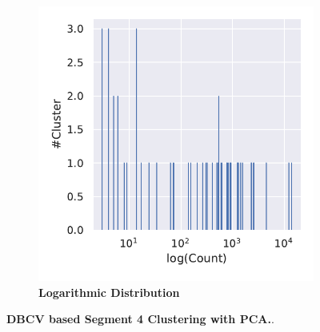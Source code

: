 \begin{figure}
\begin{adjustbox}{minipage=\dimexpr{}\fboxrule,fbox}
\begin{subfigure}[b]{0.475\textwidth}
            \includegraphics[width=\textwidth]{PCA/Cluster_Distribution_Log_Segment_4_alternative.pdf}
            \caption[Logarithmic Distribution]{\textbf{Logarithmic Distribution}}
            \label{subfig:PCA_Cluster_DBCV_Distribution_log_4}
        \end{subfigure}
    \end{adjustbox}
    \caption[\Acrshort{DBCV} based Segment 4 Clustering with \Acrshort{PCA}]{\textbf{\Acrshort{DBCV} based Segment 4 Clustering with \Acrshort{PCA}.}.}
    \label{fig:PCA_Cluster_DBCV_4}
\end{figure}

